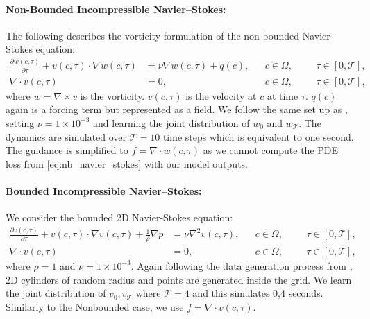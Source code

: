 \paragraph{Non-Bounded Incompressible Navier--Stokes: }
The following describes the vorticity formulation of the non-bounded Navier-Stokes equation: 
\begin{equation}
\begin{aligned}
\frac{\partial w(c,\tau)}{\partial \tau} + v(c,\tau) \cdot \nabla w(c,\tau) &= \nu \nabla w(c,\tau) + q(c), && c\in\Omega, &&&\tau\in[0,\mathcal{T}],\\
\nabla\cdot v(c,\tau) &= 0, && c\in\Omega, &&&\tau\in[0,\mathcal{T}],
\end{aligned}
\label{eq:nb_navier_stokes}
\end{equation}
where $w = \nabla \times v$ is the vorticity. $v(c, \tau)$ is the velocity at $c$ at time $\tau$. $q(c)$ again is a forcing term but represented as a field. We follow the same set up as \citep{huang2024diffusionpdegenerativepdesolvingpartial}, setting $\nu = 1 \times 10^{-3}$ and learning the joint distribution of $w_0$ and $w_{\mathcal{T}}$. The dynamics are simulated over $\mathcal{T}=10$ time steps which is equivalent to one second. The guidance is simplified to $f = \nabla \cdot w(c, \tau)$ as we cannot compute the PDE loss from \ref{eq:nb_navier_stokes} with our model outputs. 

\paragraph{Bounded Incompressible Navier--Stokes: }
We consider the bounded 2D Navier-Stokes equation: 
\begin{equation}
\begin{aligned}
\frac{\partial v(c,\tau)}{\partial \tau} + v(c,\tau) \cdot \nabla v(c,\tau) + \frac{1}{\rho} \nabla p &= \nu \nabla^2 v(c,\tau), && c\in\Omega, &&&\tau\in[0,\mathcal{T}],\\
\nabla\cdot v(c,\tau) &= 0, && c\in\Omega, &&&\tau\in[0,\mathcal{T}],
\end{aligned}
\label{eq:bounded_navier_stokes}
\end{equation}
where $\rho = 1$ and $\nu = 1 \times 10^{-3}$. Again following the data generation process from \citep{huang2024diffusionpdegenerativepdesolvingpartial}, 2D cylinders of random radius and points are generated inside the grid. We learn the joint distribution of $v_0, v_{\mathcal{T}}$ where $\mathcal{T}=4$ and this simulates 0,4 seconds. Similarly to the Nonbounded case, we use $f = \nabla \cdot v(c, \tau)$. 


